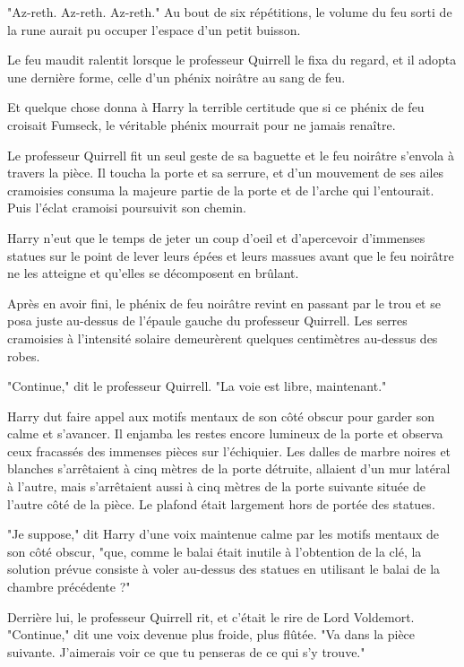 "Az-reth. Az-reth. Az-reth." Au bout de six répétitions, le volume du feu sorti de la rune aurait pu occuper l'espace d'un petit buisson.

Le feu maudit ralentit lorsque le professeur Quirrell le fixa du regard, et il adopta une dernière forme, celle d'un phénix noirâtre au sang de feu.

Et quelque chose donna à Harry la terrible certitude que si ce phénix de feu croisait Fumseck, le véritable phénix mourrait pour ne jamais renaître.

Le professeur Quirrell fit un seul geste de sa baguette et le feu noirâtre s'envola à travers la pièce. Il toucha la porte et sa serrure, et d'un mouvement de ses ailes cramoisies consuma la majeure partie de la porte et de l'arche qui l'entourait. Puis l'éclat cramoisi poursuivit son chemin.

Harry n'eut que le temps de jeter un coup d'oeil et d'apercevoir d'immenses statues sur le point de lever leurs épées et leurs massues avant que le feu noirâtre ne les atteigne et qu'elles se décomposent en brûlant.

Après en avoir fini, le phénix de feu noirâtre revint en passant par le trou et se posa juste au-dessus de l'épaule gauche du professeur Quirrell. Les serres cramoisies à l'intensité solaire demeurèrent quelques centimètres au-dessus des robes.

"Continue," dit le professeur Quirrell. "La voie est libre, maintenant."

Harry dut faire appel aux motifs mentaux de son côté obscur pour garder son calme et s'avancer. Il enjamba les restes encore lumineux de la porte et observa ceux fracassés des immenses pièces sur l'échiquier. Les dalles de marbre noires et blanches s'arrêtaient à cinq mètres de la porte détruite, allaient d'un mur latéral à l'autre, mais s'arrêtaient aussi à cinq mètres de la porte suivante située de l'autre côté de la pièce. Le plafond était largement hors de portée des statues.

"Je suppose," dit Harry d'une voix maintenue calme par les motifs mentaux de son côté obscur, "que, comme le balai était inutile à l'obtention de la clé, la solution prévue consiste à voler au-dessus des statues en utilisant le balai de la chambre précédente ?"

Derrière lui, le professeur Quirrell rit, et c'était le rire de Lord Voldemort. "Continue," dit une voix devenue plus froide, plus flûtée. "Va dans la pièce suivante. J'aimerais voir ce que tu penseras de ce qui s'y trouve."

